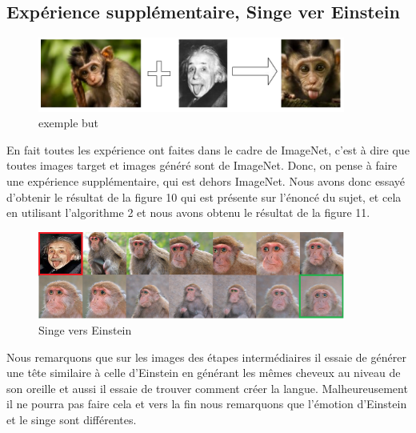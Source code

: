 \subsection{Expérience supplémentaire, Singe ver Einstein}

\begin{figure}[H] 
	\centering 
	\includegraphics[width=0.9\textwidth]{./resources/img/enoce.png} %
	\caption{exemple but } %
\end{figure}

En fait toutes les expérience ont faites dans le cadre de ImageNet, c'est à dire que toutes images target et images généré sont de ImageNet. Donc, on pense à faire une expérience supplémentaire, qui est dehors ImageNet.  Nous avons donc essayé d'obtenir le résultat de la figure 10 qui est présente sur l'énoncé du sujet, et cela en utilisant l'algorithme 2 et nous avons obtenu le résultat de la figure 11. 

\begin{figure}[H] 
	\centering 
	\includegraphics[width=0.9\textwidth]{./resources/img/singe2einstein.png} %
	\caption{Singe vers Einstein} %
\end{figure}

Nous remarquons que sur les images des étapes intermédiaires il essaie de générer une tête similaire à celle d'Einstein  en générant les mêmes cheveux au niveau de son oreille et aussi il essaie de trouver comment créer la langue. Malheureusement il ne pourra pas faire cela et vers la fin nous remarquons que l'émotion d'Einstein et le singe sont différentes.










